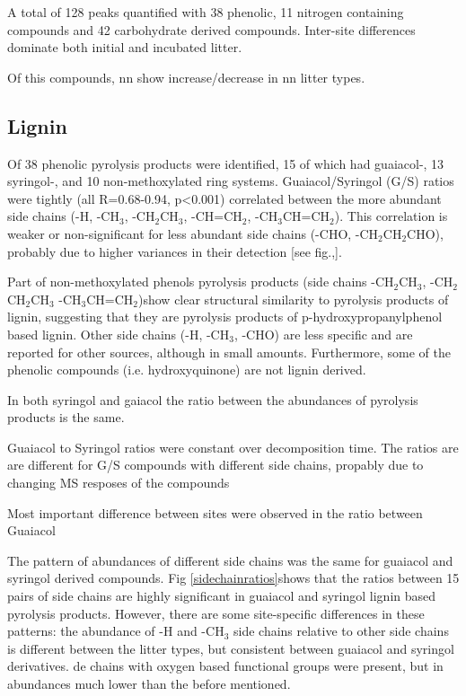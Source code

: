 \documentclass[preprint,review,12pt]{elsarticle}
\begin{document}
A total of 128 peaks quantified with 38 phenolic, 11 nitrogen containing compounds and 42 carbohydrate derived compounds. Inter-site differences dominate both initial and incubated litter. 

Of this compounds, nn show increase/decrease in nn litter types.

\subsection{Lignin}
Of 38 phenolic pyrolysis products were identified, 15 of which had guaiacol-, 13 syringol-, and 10 non-methoxylated ring systems. Guaiacol/Syringol (G/S) ratios were tightly (all R=0.68-0.94, p<0.001) correlated between the more abundant side chains (-H, -CH$_3$, -CH$_2$CH$_3$, -CH=CH$_2$, -CH$_3$CH=CH$_2$). This correlation is weaker or non-significant for less abundant side chains (-CHO, -CH$_2$CH$_2$CHO), probably due to higher variances in their detection [see fig.,]. 

Part of non-methoxylated phenols pyrolysis products (side chains -CH$_2$CH$_3$, -CH$_2$CH$_2$CH$_3$ -CH$_3$CH=CH$_2$)show clear structural similarity to pyrolysis products of lignin, suggesting that they are pyrolysis products of p-hydroxypropanylphenol based lignin. Other side chains (-H, -CH$_3$, -CHO) are less specific and are reported for other sources, although in small amounts. Furthermore, some of the phenolic compounds (i.e. hydroxyquinone) are not lignin derived. 

In both syringol and gaiacol the ratio between the abundances of pyrolysis products is the same.

Guaiacol to Syringol ratios were constant over decomposition time. The ratios are are different for G/S compounds with different side chains, propably due to changing MS resposes of the compounds 

Most important difference between sites were observed in the ratio between Guaiacol

The pattern of abundances of different side chains was the same for guaiacol and syringol derived compounds. Fig \ref{sidechainratios}shows that the ratios between 15 pairs of side chains are highly significant in guaiacol and syringol lignin based pyrolysis products. However, there are some site-specific differences in these patterns: the abundance of -H and -CH$_3$ side chains relative to other side chains is different between the litter types, but consistent between guaiacol and syringol derivatives. 
  de chains with oxygen based functional groups were present, but in abundances much lower than the before mentioned. 
\end{document}
